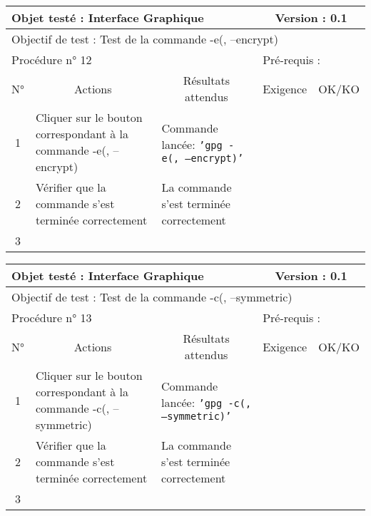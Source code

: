 \documentclass{../res/univ-projet}
\begin{document}
\begin{center}
\begin{tabular}{|c|p{5cm}|p{5cm}|p{1.5cm}|p{1.5cm}|}
\hline
\multicolumn{3}{|l|}{Objet testé : Interface Graphique} & \multicolumn{2}{c|}{Version : 0.1}\\ \hline
\multicolumn{5}{|l|}{Objectif de test : Test de la commande -e(, –encrypt)}\\ \hline
\multicolumn{3}{|l|}{Procédure n° 12} & \multicolumn{2}{p{3cm}|}{Pré-requis : }\\ \hline
\multicolumn{1}{|c|}{N°} & \multicolumn{1}{c|}{Actions} & \multicolumn{1}{c|}{Résultats attendus} & 
\multicolumn{1}{c|}{Exigence} & \multicolumn{1}{c|}{OK/KO}\\ \hline
1 & Cliquer sur le bouton correspondant à la commande -e(, –encrypt) & Commande lancée: \texttt{'gpg -e(, –encrypt)'} &  & \\
2 & Vérifier que la commande s'est terminée correctement & La commande s'est terminée correctement &  & \\
3 &  &  &  & \\ \hline
\end{tabular}
\vskip 2.2cm


\begin{tabular}{|c|p{5cm}|p{5cm}|p{1.5cm}|p{1.5cm}|}
\hline
\multicolumn{3}{|l|}{Objet testé : Interface Graphique} & \multicolumn{2}{c|}{Version : 0.1}\\ \hline
\multicolumn{5}{|l|}{Objectif de test : Test de la commande -c(, –symmetric)}\\ \hline
\multicolumn{3}{|l|}{Procédure n° 13} & \multicolumn{2}{p{3cm}|}{Pré-requis : }\\ \hline
\multicolumn{1}{|c|}{N°} & \multicolumn{1}{c|}{Actions} & \multicolumn{1}{c|}{Résultats attendus} & 
\multicolumn{1}{c|}{Exigence} & \multicolumn{1}{c|}{OK/KO}\\ \hline
1 & Cliquer sur le bouton correspondant à la commande -c(, –symmetric) & Commande lancée: \texttt{'gpg -c(, –symmetric)'} &  & \\
2 & Vérifier que la commande s'est terminée correctement & La commande s'est terminée correctement &  & \\
3 &  &  &  & \\ \hline
\end{tabular}
\vskip 2.2cm



\end{center}
\end{document}
